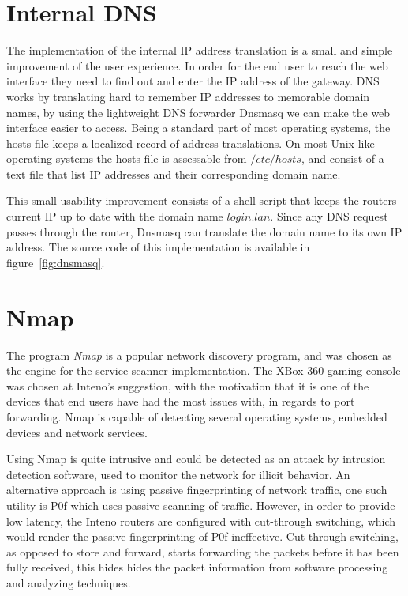 \documentclass[a4paper,11pt,makeidx]{kth-bcs}
\begin{document}
\section{Internal DNS}
The implementation of the internal IP address translation is a small and simple improvement of the user experience.
In order for the end user to reach the web interface they need to find out and enter the IP address of the gateway.
DNS works by translating hard to remember IP addresses to memorable domain names, by using the lightweight DNS forwarder Dnsmasq we can make the web interface easier to access.
Being a standard part of most operating systems, the hosts file keeps a localized record of address translations.
On most Unix-like operating systems the hosts file is assessable from $/etc/hosts$, and consist of a text file that list IP addresses and their corresponding domain name.

This small usability improvement consists of a shell script that keeps the routers current IP up to date with the domain name $login.lan$.
Since any DNS request passes through the router, Dnsmasq can translate the domain name to its own IP address.
The source code of this implementation is available in figure~\ref{fig:dnsmasq}.

\section{Nmap}
The program \emph{Nmap} is a popular network discovery program, and was chosen as the engine for the service scanner implementation.
The XBox 360 gaming console was chosen at Inteno's suggestion, with the motivation that it is one of the devices that end users have had the most issues with, in regards to port forwarding.
Nmap is capable of detecting several operating systems, embedded devices and network services.

Using Nmap is quite intrusive and could be detected as an attack by intrusion detection software, used to monitor the network for illicit behavior.
An alternative approach is using passive fingerprinting of network traffic, one such utility is P0f which uses passive scanning of traffic.\cite{p0f}
However, in order to provide low latency, the Inteno routers are configured with cut-through switching, which would render the passive fingerprinting of P0f ineffective.
Cut-through switching, as opposed to store and forward, starts forwarding the packets before it has been fully received, this hides hides the packet information from software processing and analyzing techniques.
\end{document}
